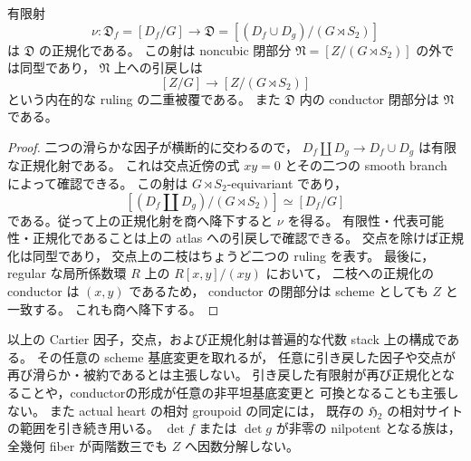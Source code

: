\begin{corollary}[unordered階数因子の正規化]
\label{cor:qa-square-rank-divisor-normalization}
有限射
\[
 \nu:\mathfrak D_f=[D_f/G]\longrightarrow
 \mathfrak D=[(D_f\cup D_g)/(G\rtimes S_2)]
\]
は $\mathfrak D$ の正規化である。
この射は noncubic 閉部分
$\mathfrak N=[Z/(G\rtimes S_2)]$ の外では同型であり，
$\mathfrak N$ 上への引戻しは
\[
 [Z/G]\longrightarrow[Z/(G\rtimes S_2)]
\]
という内在的な ruling の二重被覆である。
また $\mathfrak D$ 内の conductor 閉部分は $\mathfrak N$ である。
\end{corollary}

\begin{proof}
二つの滑らかな因子が横断的に交わるので，
$D_f\amalg D_g\to D_f\cup D_g$ は有限な正規化射である。
これは交点近傍の式 $xy=0$ とその二つの smooth branch によって確認できる。
この射は $G\rtimes S_2$-equivariant であり，
\[
 [(D_f\amalg D_g)/(G\rtimes S_2)]\simeq[D_f/G]
\]
である。従って上の正規化射を商へ降下すると $\nu$ を得る。
有限性・代表可能性・正規化であることは上の atlas への引戻しで確認できる。
交点を除けば正規化は同型であり，
交点上の二枝はちょうど二つの ruling を表す。
最後に，regular な局所係数環 $R$ 上の $R[x,y]/(xy)$ において，
二枝への正規化の conductor は $(x,y)$ であるため，
conductor の閉部分は scheme としても $Z$ と一致する。
これも商へ降下する。
\end{proof}

\begin{remark}[非被約横断族と相対サイト]
以上の Cartier 因子，交点，および正規化射は普遍的な代数 stack 上の構成である。
その任意の scheme 基底変更を取れるが，
任意に引き戻した因子や交点が再び滑らか・被約であるとは主張しない。
引き戻した有限射が再び正規化となることや，conductorの形成が任意の非平坦基底変更と
可換となることも主張しない。
また actual heart の相対 groupoid の同定には，
既存の $\mathfrak H_2$ の相対サイトの範囲を引き続き用いる。
$\det f$ または $\det g$ が非零の nilpotent となる族は，
全幾何 fiber が両階数三でも $Z$ へ因数分解しない。
\end{remark}
